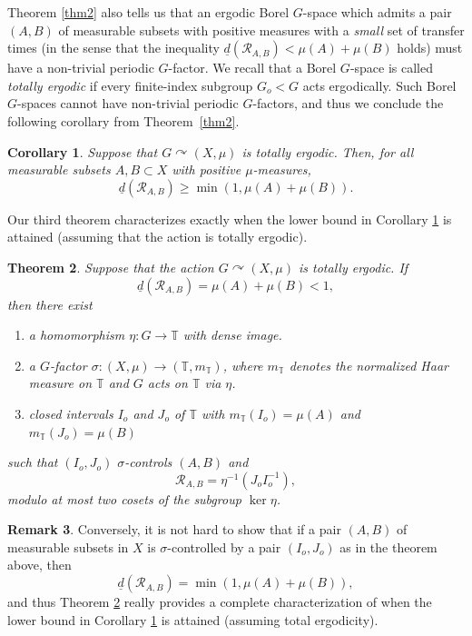 \documentclass[JEP,XML,SOM,Unicode]{cedram}
\let\mathcal\mathscr
\newcommand{\cR}{\mathcal{R}}
\newcommand{\bT}{\mathbb{T}}
\let\acts\curvearrowright
\theoremstyle{plain}
\newtheorem{theorem}{Theorem}[section]
\newtheorem{corollary}[theorem]{Corollary}
\theoremstyle{definition}
\newtheorem{remark}[theorem]{Remark}
\begin{document}
Theorem \ref{thm2} also tells us that an ergodic Borel $G$-space which admits a pair $(A,B)$ of measurable subsets with positive measures with
a \emph{small} set of transfer times (in the sense that the inequality $\underline{d}(\cR_{A,B}) < \mu(A) + \mu(B)$ holds) must have a non-trivial periodic $G$-factor. We recall that a Borel $G$-space is called \emph{totally ergodic} if every finite-index subgroup $G_o < G$ acts ergodically. Such Borel $G$-spaces cannot have non-trivial periodic $G$-factors, and thus we conclude the following corollary from Theorem~\ref{thm2}.

\begin{corollary}
\label{cor_toterg}
Suppose that $G \acts (X,\mu)$ is totally ergodic. Then, for all measurable subsets $A, B \subset X$ with positive $\mu$-measures,
\[
\underline{d}(\cR_{A,B}) \geq \min(1,\mu(A) + \mu(B)).
\]
\end{corollary}

Our third theorem characterizes exactly when the lower bound in Corollary \ref{cor_toterg} is attained (assuming that the action is totally ergodic).

\begin{theorem}
\label{thm3}
Suppose that the action $G \acts (X,\mu)$ is totally ergodic. If
\[
\underline{d}(\cR_{A,B}) = \mu(A) + \mu(B) < 1,
\]
then there exist

\begin{enumerate}
\item
a homomorphism $\eta : G \to \bT$ with dense image.
\item
a $G$-factor $\sigma : (X,\mu) \to (\bT,m_{\bT})$, where $m_{\bT}$ denotes the normalized Haar measure on $\bT$
and $G$ acts on $\bT$ via $\eta$.
\item
closed intervals $I_o$ and $J_o$ of $\bT$ with $m_{\bT}(I_o) = \mu(A)$ and $m_{\bT}(J_o) = \mu(B)$
\end{enumerate}
such that $(I_o,J_o)$ $\sigma$-controls $(A,B)$ and
\[
\cR_{A,B} = \eta^{-1}(J_o I_o^{-1}),
\]
modulo at most two cosets of the subgroup $\ker \eta$.
\end{theorem}

\begin{remark}
Conversely, it is not hard to show that if a pair $(A,B)$ of measurable subsets in $X$ is $\sigma$-controlled by a pair $(I_o,J_o)$ as in the theorem above, then
\[
\underline{d}(\cR_{A,B}) = \min(1,\mu(A) + \mu(B)),
\]
and thus Theorem \ref{thm3} really provides a complete characterization of when the lower bound in Corollary \ref{cor_toterg} is attained (assuming total ergodicity).
\end{remark}
\end{document}
